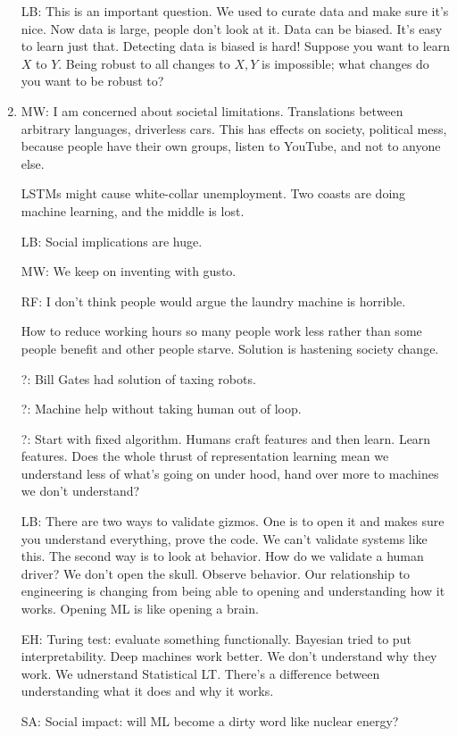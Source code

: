 \begin{enumerate}
LB: This is an important question. We used to curate data and make sure it's nice. Now data is large, people don't look at it. Data can be biased. It's easy to learn just that. Detecting data is biased is hard!
Suppose you want to learn $X$ to $Y$. %
Being robust to all changes to $X,Y$ is impossible; what changes do you want to be robust to?
\item
MW: I am concerned about societal limitations. Translations between arbitrary languages, driverless cars. This has effects on society, political mess, because people have their own groups, listen to YouTube, and not to anyone else.

LSTMs might cause white-collar unemployment. Two coasts are doing machine learning, and the middle is lost.

LB: Social implications are huge. 

MW: We keep on inventing with gusto.

RF: 
I don't think people would argue the laundry machine is horrible.

How to reduce working hours so many people work less rather than some people benefit and other people starve. Solution is hastening society change.


?: Bill Gates had solution of taxing robots.

?: Machine help without taking human out of loop.

?: Start with fixed algorithm. Humans craft features and then learn. Learn features. Does the whole thrust of representation learning mean we understand less of what's going on under hood, hand over more to machines we don't understand?

LB: There are two ways to validate gizmos. One is to open it and makes sure you understand everything, prove the code. We can't validate systems like this. 
The second way is to look at behavior. How do we validate a human driver? We don't open the skull. Observe behavior.
Our relationship to engineering is changing from being able to opening and understanding how it works. 
Opening ML is like opening a brain.

EH: Turing test: evaluate something functionally. Bayesian tried to put interpretability. Deep machines work better. We don't understand why they work. We udnerstand Statistical LT. There's a difference between understanding what it does and why it works. 

SA: Social impact: will ML become a dirty word like nuclear energy?


\end{enumerate}
